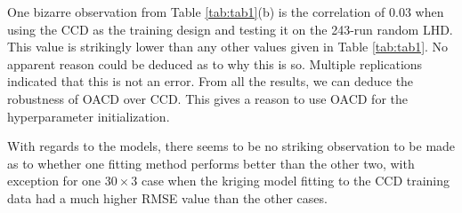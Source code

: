 \documentclass [PhD] {package/uclathes}
\begin{document}
One bizarre observation from Table \ref{tab:tab1}(b) is the correlation of $0.03$ when using the CCD as the training design and testing it on the 243-run random LHD. This value is strikingly lower than any other values given in Table \ref{tab:tab1}. No apparent reason could be deduced as to why this is so. Multiple replications indicated that this is not an error.  From all the results, we can deduce the robustness of OACD over CCD. This gives a reason to use OACD for the hyperparameter initialization.








With regards to the models, there seems to be no striking observation to be made as to whether one fitting method performs better than the other two, with  exception for one $30 \times 3$ case when the kriging model fitting to the CCD training data had a much higher RMSE value than the other cases.
\end{document}
